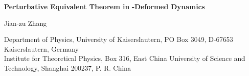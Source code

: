 \documentclass[a4paper,12pt]{article}
\begin{document}
  \thispagestyle{empty}
  \pagestyle{empty}
  \renewcommand{\thefootnote}{\fnsymbol{footnote}}
\newpage\normalsize
    \pagestyle{plain}
    \setlength{\baselineskip}{4ex}\par
    \setcounter{footnote}{0}
    \renewcommand{\thefootnote}{\arabic{footnote}}
\providecommand{\preprint}[1]{%
  \begin{flushright}
    \setlength{\baselineskip}{3ex} #1
  \end{flushright}}
\renewcommand{\title}[1]{%
  \begin{center}
    \LARGE #1
  \end{center}\par}
\renewcommand{\author}[1]{%
  \vspace{2ex}
  {\Large
   \begin{center}
     \setlength{\baselineskip}{3ex} #1 \par
   \end{center}}}
\renewcommand{\thanks}[1]{\footnote{#1}}
\begin{flushright}
\end{flushright}
\vskip 0.5cm

\begin{center}
{\large \bf Perturbative Equivalent Theorem in \coordHE{}-Deformed Dynamics}
\end{center}
\vspace{1cm}
\begin{center}
Jian-zu Zhang\coordHE{}
\end{center}
\vspace{1cm}
\begin{center}
\coordHE{}  Department of Physics,
University of Kaiserslautern, PO Box 3049, D-67653  Kaiserslautern, Germany \\
\coordHE{} Institute for Theoretical Physics, Box 316,
East China University of Science and Technology, 
Shanghai 200237, P. R. China
\end{center}
\vspace{1cm}
\end{document}
